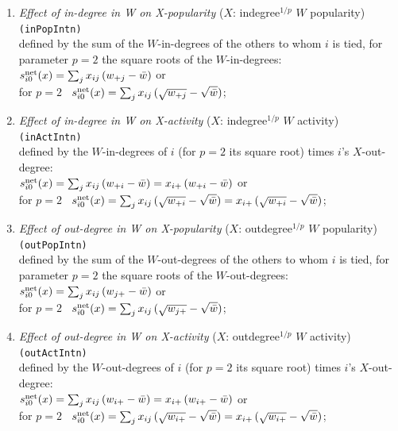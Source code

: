 \documentclass[a4paper,fleqn,11pt]{article}
\newcommand{\+}{\, + \,}
\newcommand{\vit}{\theenumi}
\newcounter{savenumi}
\begin{document}
\begin{enumerate}
\setcounter{enumi}{\value{savenumi}}
 \item {\em Effect of in-degree in W on X-popularity } ($X$: indegree$^{1/p}$ $W$ popularity)   \texttt{(inPopIntn)}\\
 defined by   the sum of  the $W$-in-degrees of the others to whom $i$ is tied,
 for parameter $p = 2$ the square roots of the $W$-in-degrees:\\
 $s^{\rm net}_{i\vit}(x) =  \sum_j x_{ij}\, ({w_{+j}} - {\bar w})  $ or\\
for $p=2$ \  $s^{\rm net}_{i\vit}(x) =  \sum_j x_{ij}\, (\sqrt{w_{+j}} - \sqrt{\bar w})  $;\\

 \item {\em Effect of in-degree in W on X-activity } ($X$: indegree$^{1/p}$ $W$ activity)  \texttt{(inActIntn)}\\
 defined by the $W$-in-degrees of $i$ (for $p = 2$ its square root)
 times $i$'s $X$-out-degree:\\[0.2em]
 $s^{\rm net}_{i\vit}(x) =  \sum_j x_{ij}\, ({w_{+i}} - {\bar w})
                 =  x_{i+}\, ({w_{+i}} - {\bar w}) $ or\\[0.2em]
for $p=2$ \  $s^{\rm net}_{i\vit}(x) =  \sum_j x_{ij}\, (\sqrt{w_{+i}} - \sqrt{\bar w})
                 =  x_{i+}\, (\sqrt{w_{+i}} - \sqrt{\bar w}) $;\\[0.2em]

 \item {\em Effect of out-degree in W on X-popularity } ($X$: outdegree$^{1/p}$ $W$ popularity) \texttt{(outPopIntn)}\\
 defined by   the sum of  the $W$-out-degrees of the others to whom $i$ is tied,
 for parameter $p = 2$ the square roots of the $W$-out-degrees:\\[0.2em]
 $s^{\rm net}_{i\vit}(x) =  \sum_j x_{ij}\, ({w_{j+}} - {\bar w})$ or\\[0.2em]
for $p=2$ \  $s^{\rm net}_{i\vit}(x) =  \sum_j x_{ij}\, (\sqrt{w_{j+}} - \sqrt{\bar w})$;\\[0.2em]

 \item {\em Effect of out-degree  in W on X-activity } ($X$: outdegree$^{1/p}$ $W$ activity) \texttt{(outActIntn)}\\
 defined by the $W$-out-degrees of $i$ (for $p = 2$ its square root)
 times $i$'s $X$-out-degree:\\[0.2em]
 $s^{\rm net}_{i\vit}(x) =  \sum_j x_{ij}\, ({w_{i+}} - {\bar w}) =
                           x_{i+}\, ({w_{i+}} - {\bar w}) $ or\\[0.2em]
for $p=2$ \  $s^{\rm net}_{i\vit}(x) =  \sum_j x_{ij}\, (\sqrt{w_{i+}} - \sqrt{\bar w}) =
                           x_{i+}\, (\sqrt{w_{i+}} - \sqrt{\bar w}) $;\\[0.2em]


\end{enumerate}
\end{document}
